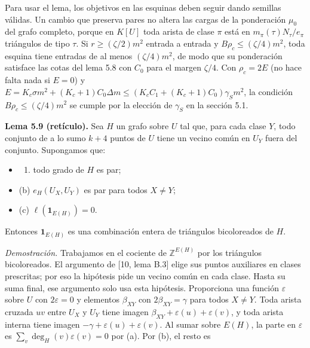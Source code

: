 \documentclass[spanish,11pt,a4paper]{article}
\providecommand{\tightlist}{\setlength{\itemsep}{0pt}\setlength{\parskip}{0pt}}
\begin{document}
Para usar el lema, los objetivos en las esquinas deben seguir dando semillas válidas. Un cambio que preserva pares no altera las cargas de la ponderación \(\mu_0\) del grafo completo, porque en \(K[U]\) toda arista de clase \(\pi\) está en \(m_\pi(\tau)N_\tau/e_\pi\) triángulos de tipo \(\tau\). Si \(r\ge(\zeta/2)m^2\) entrada a entrada y \(B\rho_c\le(\zeta/4)m^2\), toda esquina tiene entradas de al menos \((\zeta/4)m^2\), de modo que su ponderación satisface las cotas del lema 5.8 con \(C_0\) para el margen \(\zeta/4\). Con \(\rho_c=2E\) (no hace falta nada si \(E=0\)) y \(E=K_c\sigma m^2+(K_c+1)C_0\Delta m\le(K_cC_1+(K_c+1)C_0)\gamma_Sm^2\), la condición \(B\rho_c\le(\zeta/4)m^2\) se cumple por la elección de \(\gamma_S\) en la sección 5.1.

\textbf{Lema 5.9 (retículo).} Sea \(H\) un grafo sobre \(U\) tal que, para cada clase \(Y\), todo conjunto de a lo sumo \(k+4\) puntos de \(U\) tiene un vecino común en \(U_Y\) fuera del conjunto. Supongamos que:

\begin{itemize}
\tightlist
\item
  \begin{enumerate}
  \def\labelenumi{(\alph{enumi})}
  \tightlist
  \item
    todo grado de \(H\) es par;
  \end{enumerate}
\item
  (b) \(e_H(U_X,U_Y)\) es par para todos \(X\ne Y\);
\item
  (c) \(\ell(\mathbf 1_{E(H)})=0\).
\end{itemize}

Entonces \(\mathbf 1_{E(H)}\) es una combinación entera de triángulos bicoloreados de \(H\).

\emph{Demostración.} Trabajamos en el cociente de \(\mathbb Z^{E(H)}\) por los triángulos bicoloreados. El argumento de {[}10, lema B.3{]} elige sus puntos auxiliares en clases prescritas; por eso la hipótesis pide un vecino común en cada clase. Hasta su suma final, ese argumento solo usa esta hipótesis. Proporciona una función \(\varepsilon\) sobre \(U\) con \(2\varepsilon=0\) y elementos \(\beta_{XY}\) con \(2\beta_{XY}=\gamma\) para todos \(X\ne Y\). Toda arista cruzada \(uv\) entre \(U_X\) y \(U_Y\) tiene imagen \(\beta_{XY}+\varepsilon(u)+\varepsilon(v)\), y toda arista interna tiene imagen \(-\gamma+\varepsilon(u)+\varepsilon(v)\). Al sumar sobre \(E(H)\), la parte en \(\varepsilon\) es \(\sum_v\deg_H(v)\varepsilon(v)=0\) por (a). Por (b), el resto es
\end{document}

